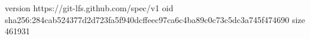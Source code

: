 version https://git-lfs.github.com/spec/v1
oid sha256:284cab524377d2d723fa5f940dcffeec97ca6c4ba89c0c73c5dc3a745f474690
size 461931
